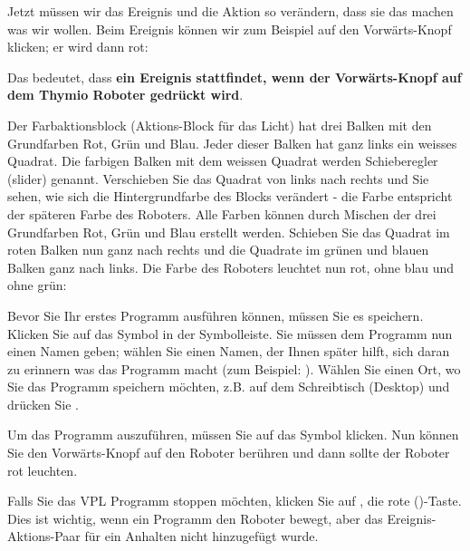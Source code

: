 Jetzt müssen wir das Ereignis und die Aktion so verändern, dass sie das machen was wir wollen. Beim Ereignis können wir zum Beispiel auf den Vorwärts-Knopf klicken; er wird dann rot: 

Das bedeutet, dass \textbf{ein Ereignis stattfindet, wenn der Vorwärts-Knopf auf dem Thymio Roboter gedrückt wird}.

Der Farbaktionsblock (Aktions-Block für das Licht) hat drei Balken mit den Grundfarben Rot, Grün und Blau.
Jeder dieser Balken hat ganz links ein weisses Quadrat. Die farbigen Balken mit dem weissen Quadrat werden Schieberegler (slider) genannt. Verschieben Sie das Quadrat von links nach rechts und Sie sehen, wie sich die Hintergrundfarbe des Blocks verändert - die Farbe entspricht der späteren Farbe des Roboters. Alle Farben können durch Mischen der drei Grundfarben Rot, Grün und Blau erstellt werden.
Schieben Sie das Quadrat im roten Balken nun ganz nach rechts und die Quadrate im grünen und blauen Balken ganz nach links. Die Farbe des Roboters
leuchtet nun rot, ohne blau und ohne grün: 


Bevor Sie Ihr erstes Programm ausführen können, müssen Sie es speichern. Klicken Sie auf das Symbol  in der Symbolleiste. Sie müssen dem Programm nun einen Namen geben; wählen Sie einen Namen, der Ihnen später hilft, sich daran zu erinnern was das Programm macht (zum Beispiel: ). Wählen Sie einen Ort, wo Sie das Programm speichern möchten, z.B. auf dem Schreibtisch (Desktop) und drücken Sie .



Um das Programm auszuführen, müssen Sie auf das Symbol   klicken. Nun können Sie den Vorwärts-Knopf auf den Roboter berühren und dann sollte der Roboter rot leuchten. 


Falls Sie das VPL Programm stoppen möchten, klicken Sie auf , die rote ()-Taste.
Dies ist wichtig, wenn ein Programm den Roboter bewegt, aber das Ereignis-Aktions-Paar für ein Anhalten nicht hinzugefügt wurde. 

